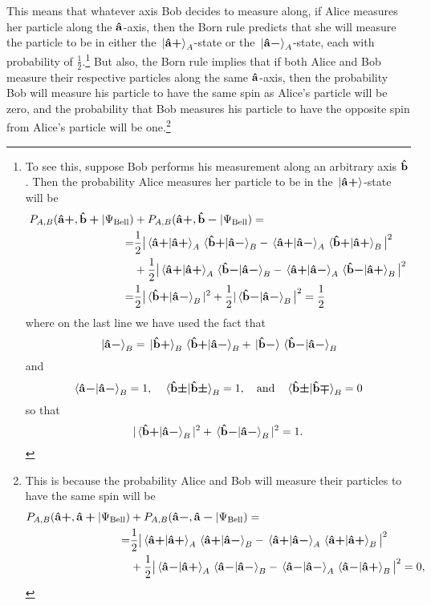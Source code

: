 This means that whatever axis Bob decides to measure along, if Alice measures her particle along the $\vb{\hat{{a}}}$-axis, then the Born rule predicts that she will measure the particle to be in either the $\ket*{\vb{\hat{{a}}}\bm{+}}_A$-state or the $\ket*{\vb{\hat{{a}}}\bm{-}}_A$-state, each with probability of $\frac{1}{2}$.\footnote{To see this, suppose Bob performs his measurement along an arbitrary axis $\vb{\hat{{b}}}$. Then the probability Alice measures her particle to be in the $\ket*{\vb{\hat{{a}}}\bm{+}}$-state will be 
\begin{equation}
    \begin{split}
        P_{A,B}(\uvbp{a},\uvbp{b}|\Psi_{\text{Bell}})&+P_{A,B}(\uvbp{a},\uvbm{b}|\Psi_{\text{Bell}})= \\
        =&\frac{1}{2}\big| \ip*{\uvbp{a}}{\uvbp{a}}_A\ip*{\uvbp{b}}{\uvbm{a}}_B-\ip*{\uvbp{a}}{\uvbm{a}}_A\ip*{\uvbp{b}}{\uvbp{a}}_B\big|^2\\
        &+\frac{1}{2}\big|\ip*{\uvbp{a}}{\uvbp{a}}_A\ip*{\uvbm{b}}{\uvbm{a}}_B-\ip*{\uvbp{a}}{\uvbm{a}}_A\ip*{\uvbm{b}}{\uvbp{a}}_B\big|^2\\
        =&\frac{1}{2}\big|\ip*{\uvbp{b}}{\uvbm{a}}_B|^2+\frac{1}{2}|\ip*{\uvbm{b}}{\uvbm{a}}_B\big|^2=\frac{1}{2}
    \end{split}
\end{equation} 
where on the last line we have used the fact that 
$$\ket*{\uvbm{a}}_B=\ket*{\uvbp{b}}_B\ip*{\uvbp{b}}{\uvbm{a}}_B+\ket*{\uvbm{b}}\ip*{\uvbm{b}}{\uvbm{a}}_B$$
and 
$$\ip*{\uvbm{a}}{\uvbm{a}}_B=1,\quad\ip*{\uvbpm{b}}{\uvbpm{b}}_B=1,\quad\text{and}\quad \ip*{\uvbpm{b}}{\uvbmp{b}}_B=0$$
so that 
$$|\ip*{\uvbp{b}}{\uvbm{a}}_B|^2+\ip*{\uvbm{b}}{\uvbm{a}}_B|^2=1.$$
} But also, the Born rule implies that if both Alice and Bob measure their respective particles along the same $\vb{\hat{{a}}}$-axis, then the probability Bob will measure his particle to have the same spin as Alice's particle will be zero, and the probability that Bob measures his particle to have the opposite spin from Alice's particle will be one.\footnote{This is because the probability Alice and Bob will measure their particles to have the same spin will be 
\begin{equation}
\begin{split}
    P_{A,B}(\uvbp{a},\uvbp{a}|\Psi_{\text{Bell}})&+P_{A,B}(\uvbm{a},\uvbm{a}|\Psi_{\text{Bell}})= \\
    =&\frac{1}{2}\big| \ip*{\uvbp{a}}{\uvbp{a}}_A\ip*{\uvbp{a}}{\uvbm{a}}_B-\ip*{\uvbp{a}}{\uvbm{a}}_A\ip*{\uvbp{a}}{\uvbp{a}}_B\big|^2\\
    &+\frac{1}{2}\big|\ip*{\uvbm{a}}{\uvbp{a}}_A\ip*{\uvbm{a}}{\uvbm{a}}_B-\ip*{\uvbm{a}}{\uvbm{a}}_A\ip*{\uvbm{a}}{\uvbp{a}}_B\big|^2=0,

\end{split}
\end{equation}}
